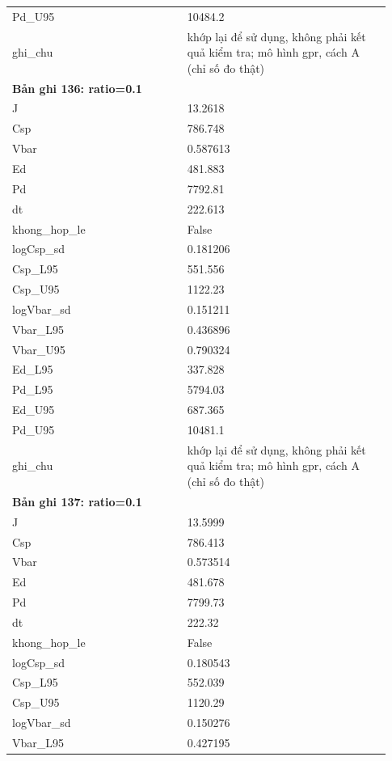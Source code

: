 \begin{longtable}{p{0.43\linewidth}p{0.50\linewidth}}
Pd\_\allowbreak U95 & 10484.2 \\
ghi\_\allowbreak chu & khớp lại để sử dụng, không phải kết quả kiểm tra; mô hình gpr, cách A (chỉ số đo thật) \\
\midrule
\multicolumn{2}{p{0.95\linewidth}}{\textbf{Bản ghi 136: ratio=0.1}} \\
J & 13.2618 \\
Csp & 786.748 \\
Vbar & 0.587613 \\
Ed & 481.883 \\
Pd & 7792.81 \\
dt & 222.613 \\
khong\_\allowbreak hop\_\allowbreak le & False \\
logCsp\_\allowbreak sd & 0.181206 \\
Csp\_\allowbreak L95 & 551.556 \\
Csp\_\allowbreak U95 & 1122.23 \\
logVbar\_\allowbreak sd & 0.151211 \\
Vbar\_\allowbreak L95 & 0.436896 \\
Vbar\_\allowbreak U95 & 0.790324 \\
Ed\_\allowbreak L95 & 337.828 \\
Pd\_\allowbreak L95 & 5794.03 \\
Ed\_\allowbreak U95 & 687.365 \\
Pd\_\allowbreak U95 & 10481.1 \\
ghi\_\allowbreak chu & khớp lại để sử dụng, không phải kết quả kiểm tra; mô hình gpr, cách A (chỉ số đo thật) \\
\midrule
\multicolumn{2}{p{0.95\linewidth}}{\textbf{Bản ghi 137: ratio=0.1}} \\
J & 13.5999 \\
Csp & 786.413 \\
Vbar & 0.573514 \\
Ed & 481.678 \\
Pd & 7799.73 \\
dt & 222.32 \\
khong\_\allowbreak hop\_\allowbreak le & False \\
logCsp\_\allowbreak sd & 0.180543 \\
Csp\_\allowbreak L95 & 552.039 \\
Csp\_\allowbreak U95 & 1120.29 \\
logVbar\_\allowbreak sd & 0.150276 \\
Vbar\_\allowbreak L95 & 0.427195 \\

\end{longtable}
